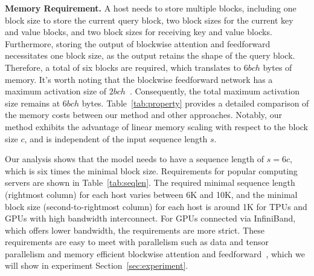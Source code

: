 \documentclass{article}
\begin{document}
\textbf{Memory Requirement.}
A host needs to store multiple blocks, including one block size to store the current query block, two block sizes for the current key and value blocks, and two block sizes for receiving key and value blocks. Furthermore, storing the output of blockwise attention and feedforward necessitates one block size, as the output retains the shape of the query block. Therefore, a total of six blocks are required, which translates to $6bch$ bytes of memory.
It's worth noting that the blockwise feedforward network has a maximum activation size of $2bch$~\citep{liu2023blockwise}. Consequently, the total maximum activation size remains at $6bch$ bytes.
Table~\ref{tab:property} provides a detailed comparison of the memory costs between our method and other approaches. Notably, our method exhibits the advantage of linear memory scaling with respect to the block size $c$, and is independent of the input sequence length $s$.

Our analysis shows that the model needs to have a sequence length of $s=6c$, which is six times the minimal block size. Requirements for popular computing servers are shown in Table~\ref{tab:seqlen}. The required minimal sequence length (rightmost column) for each host varies between 6K and 10K, and the minimal block size (second-to-rightmost column) for each host is around 1K for TPUs and GPUs with high bandwidth interconnect.
For GPUs connected via InfiniBand, which offers lower bandwidth, the requirements are more strict.
These requirements are easy to meet with parallelism such as data and tensor parallelism and memory efficient blockwise attention and feedforward~\citep{rabe2021self,dao2022flashattention,liu2023blockwise}, which we will show in experiment Section~\ref{sec:experiment}.
\end{document}
